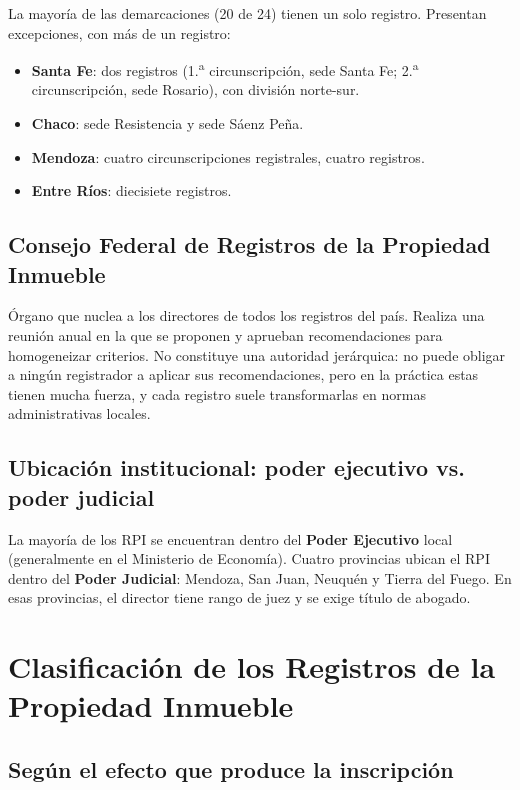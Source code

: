 \documentclass[12pt,oneside]{book}
\begin{document}
La mayoría de las demarcaciones (20 de 24) tienen un solo registro. Presentan excepciones, con más de un registro:

\begin{itemize}
    \item \textbf{Santa Fe}: dos registros (1.\textsuperscript{a} circunscripción, sede Santa Fe; 2.\textsuperscript{a} circunscripción, sede Rosario), con división norte-sur.
    \item \textbf{Chaco}: sede Resistencia y sede Sáenz Peña.
    \item \textbf{Mendoza}: cuatro circunscripciones registrales, cuatro registros.
    \item \textbf{Entre Ríos}: diecisiete registros.
\end{itemize}

\subsection{Consejo Federal de Registros de la Propiedad Inmueble}

Órgano que nuclea a los directores de todos los registros del país. Realiza una reunión anual en la que se proponen y aprueban recomendaciones para homogeneizar criterios. No constituye una autoridad jerárquica: no puede obligar a ningún registrador a aplicar sus recomendaciones, pero en la práctica estas tienen mucha fuerza, y cada registro suele transformarlas en normas administrativas locales.

\subsection{Ubicación institucional: poder ejecutivo vs. poder judicial}

La mayoría de los RPI se encuentran dentro del \textbf{Poder Ejecutivo} local (generalmente en el Ministerio de Economía). Cuatro provincias ubican el RPI dentro del \textbf{Poder Judicial}: Mendoza, San Juan, Neuquén y Tierra del Fuego. En esas provincias, el director tiene rango de juez y se exige título de abogado.

\section{Clasificación de los Registros de la Propiedad Inmueble}

\subsection{Según el efecto que produce la inscripción}
\end{document}
